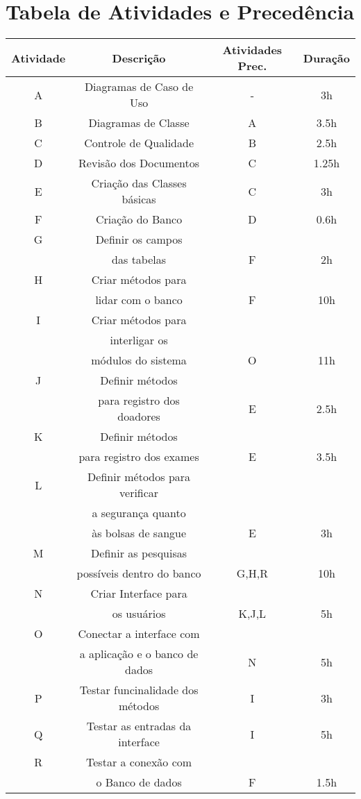 \documentclass[12pt,a4paper,final]{report}
\begin{document}
\section*{Tabela de Atividades e Precedência}
\begin{center}
\begin{tabular}{|c|c|c|c|}
\hline 
Atividade & Descrição & Atividades Prec. & Duração \\ 
\hline 
A & Diagramas de Caso de Uso & - & 3h \\ 
\hline 
B & Diagramas de Classe & A & 3.5h \\ 
\hline 
C & Controle de Qualidade & B & 2.5h \\ 
\hline 
D & Revisão dos Documentos & C & 1.25h \\
\hline 
E & Criação das Classes básicas & C & 3h \\
\hline 
F & Criação do Banco & D & 0.6h \\ 
\hline 
G & Definir os campos & & \\ & das tabelas & F & 2h \\ 
\hline 
H & Criar métodos para & & \\ & lidar com o banco & F & 10h \\
\hline 
I & Criar métodos para & & \\ & interligar os & & \\ & módulos do sistema & O & 11h \\
\hline 
J & Definir métodos & & \\ & para registro dos doadores & E & 2.5h \\ 
\hline 
K & Definir métodos & & \\ & para registro dos exames & E &  3.5h \\ 
\hline 
L & Definir métodos para verificar & & \\ & a segurança quanto & & \\ & às bolsas de sangue & E & 3h \\ 
\hline 
M & Definir as pesquisas  & & \\ & possíveis dentro do banco & G,H,R & 10h \\ 
\hline 
N & Criar Interface para & & \\ & os usuários & K,J,L & 5h \\ 
\hline 
O & Conectar a interface com & & \\ & a aplicação e o banco de dados & N & 5h \\ 
\hline 
P & Testar funcinalidade dos métodos & I & 3h \\ 
\hline 
Q & Testar as entradas da interface & I & 5h \\ 
\hline 
R & Testar a conexão com & & \\ & o Banco de dados & F & 1.5h \\ 
\hline 
\end{tabular} 
\end{center}
\end{document}
